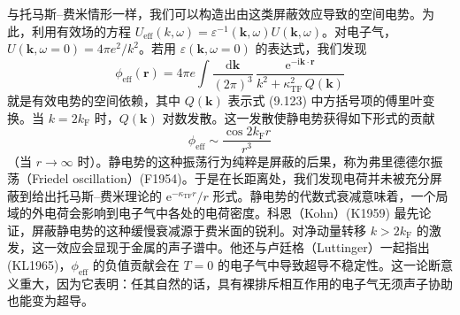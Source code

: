 与托马斯–费米情形一样，我们可以构造出由这类屏蔽效应导致的空间电势。为此，利用有效场的方程 $U_{\mathrm{eff}}(k,\omega)=\varepsilon^{-1}(\mathbf{k},\omega)U(\mathbf{k},\omega)$。对电子气，$U(\mathbf{k},\omega=0)=4\pi e^2/k^2$。若用 $\varepsilon(\mathbf{k},\omega=0)$ 的表达式，我们发现
\begin{equation*}
\phi_{\mathrm{eff}}(\mathbf{r})=4\pi e\int\frac{\mathrm{d}\mathbf{k}}{(2\pi)^3}\,\frac{\mathrm{e}^{-\mathrm{i}\mathbf{k}\cdot\mathbf{r}}}{k^2+\kappa_{\mathrm{TF}}^2\,Q(\mathbf{k})}\tag{9.124}
\end{equation*}
就是有效电势的空间依赖，其中 $Q(\mathbf{k})$ 表示式 (9.123) 中方括号项的傅里叶变换。当 $k=2k_{\mathrm{F}}$ 时，$Q(\mathbf{k})$ 对数发散。这一发散使静电势获得如下形式的贡献
\begin{equation*}
\phi_{\mathrm{eff}}\sim\frac{\cos 2k_{\mathrm{F}}r}{r^3}\tag{9.125}
\end{equation*}
（当 $r\to\infty$ 时）。静电势的这种振荡行为纯粹是屏蔽的后果，称为弗里德德尔振荡（Friedel oscillation）(F1954)。于是在长距离处，我们发现电荷并未被充分屏蔽到给出托马斯–费米理论的 $\mathrm{e}^{-\kappa_{\mathrm{TF}}r}/r$ 形式。静电势的代数式衰减意味着，一个局域的外电荷会影响到电子气中各处的电荷密度。科恩（Kohn）(K1959) 最先论证，屏蔽静电势的这种缓慢衰减源于费米面的锐利。对净动量转移 $k>2k_{\mathrm{F}}$ 的激发，这一效应会显现于金属的声子谱中。他还与卢廷格（Luttinger）一起指出 (KL1965)，$\phi_{\mathrm{eff}}$ 的负值贡献会在 $T=0$ 的电子气中导致超导不稳定性。这一论断意义重大，因为它表明：任其自然的话，具有裸排斥相互作用的电子气无须声子协助也能变为超导。
